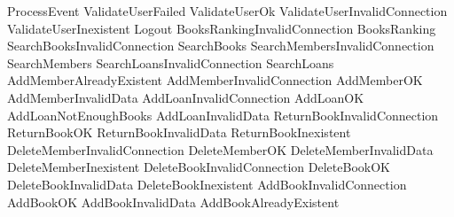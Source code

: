 \begin{zed} ProcessEvent \sdef 
ValidateUserFailed 
\lor ValidateUserOk 
\lor ValidateUserInvalidConnection 
\lor ValidateUserInexistent
\lor Logout
\lor BooksRankingInvalidConnection
\lor BooksRanking
\lor SearchBooksInvalidConnection
\lor SearchBooks
\lor SearchMembersInvalidConnection
\lor SearchMembers
\lor SearchLoansInvalidConnection
\lor SearchLoans
\lor AddMemberAlreadyExistent
\lor AddMemberInvalidConnection
\lor AddMemberOK
\lor AddMemberInvalidData
\lor AddLoanInvalidConnection
\lor AddLoanOK 
\lor AddLoanNotEnoughBooks
\lor AddLoanInvalidData
\lor ReturnBookInvalidConnection
\lor ReturnBookOK
\lor ReturnBookInvalidData
\lor ReturnBookInexistent
\lor DeleteMemberInvalidConnection
\lor DeleteMemberOK
\lor DeleteMemberInvalidData
\lor DeleteMemberInexistent
\lor DeleteBookInvalidConnection
\lor DeleteBookOK
\lor DeleteBookInvalidData
\lor DeleteBookInexistent
\lor AddBookInvalidConnection
\lor AddBookOK
\lor AddBookInvalidData
\lor AddBookAlreadyExistent
\end{zed}

